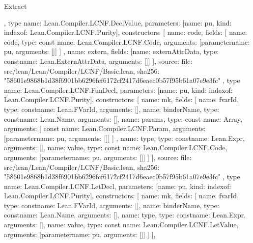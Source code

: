 \begin{lexlean}{Extract}
\begin{toolingmodule}
{{{      }
    },
    type{
      name: Lean.Compiler.LCNF.DeclValue,
      parameters: [{name: pu, kind: index{of: Lean.Compiler.LCNF.Purity}}],
      constructors: [
        {
          name: code,
          fields: [
            {
              name: code,
              type: const{
                name: Lean.Compiler.LCNF.Code,
                arguments: [parameter{name: pu, arguments: []}]
              }
            }
          ]
        },
        {
          name: extern,
          fields: [{name: externAttrData, type: const{name: Lean.ExternAttrData, arguments: []}}]
        }
      ],
      source: {
        file: src/lean/Lean/Compiler/LCNF/Basic.lean,
        sha256: "58601e9868b1d38f6901bb6296fcf6172cf2417d6eaec0b57f95b61a07e9e3fc"
      }
    },
    type{
      name: Lean.Compiler.LCNF.FunDecl,
      parameters: [{name: pu, kind: index{of: Lean.Compiler.LCNF.Purity}}],
      constructors: [
        {
          name: mk,
          fields: [
            {name: fvarId, type: const{name: Lean.FVarId, arguments: []}},
            {name: binderName, type: const{name: Lean.Name, arguments: []}},
            {
              name: params,
              type: const{
                name: Array,
                arguments: [
                  const{
                    name: Lean.Compiler.LCNF.Param,
                    arguments: [parameter{name: pu, arguments: []}]
                  }
                ]
              }
            },
            {name: type, type: const{name: Lean.Expr, arguments: []}},
            {
              name: value,
              type: const{
                name: Lean.Compiler.LCNF.Code,
                arguments: [parameter{name: pu, arguments: []}]
              }
            }
          ]
        }
      ],
      source: {
        file: src/lean/Lean/Compiler/LCNF/Basic.lean,
        sha256: "58601e9868b1d38f6901bb6296fcf6172cf2417d6eaec0b57f95b61a07e9e3fc"
      }
    },
    type{
      name: Lean.Compiler.LCNF.LetDecl,
      parameters: [{name: pu, kind: index{of: Lean.Compiler.LCNF.Purity}}],
      constructors: [
        {
          name: mk,
          fields: [
            {name: fvarId, type: const{name: Lean.FVarId, arguments: []}},
            {name: binderName, type: const{name: Lean.Name, arguments: []}},
            {name: type, type: const{name: Lean.Expr, arguments: []}},
            {
              name: value,
              type: const{
                name: Lean.Compiler.LCNF.LetValue,
                arguments: [parameter{name: pu, arguments: []}]
              }
            }
          ]
        }
      ],
}}
\end{toolingmodule}
\end{lexlean}
